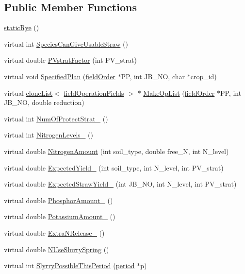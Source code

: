 \subsection*{Public Member Functions}
\begin{DoxyCompactItemize}
\item 
\hyperlink{classstatic_rye_ac213bcfc28e5c41044f1f8c1c0bcbe71}{staticRye} ()
\item 
virtual int \hyperlink{classstatic_rye_ad0e64c4bdab814efbe44b1ffbaf9a322}{SpeciesCanGiveUsableStraw} ()
\item 
virtual double \hyperlink{classstatic_rye_a2a8f5a4738e856f635722ea48bf1ea04}{PVstratFactor} (int PV\_\-strat)
\item 
virtual void \hyperlink{classstatic_rye_a9842ed0a85f8e721762a72f0d2252587}{SpecifiedPlan} (\hyperlink{classfield_order}{fieldOrder} $\ast$PP, int JB\_\-NO, char $\ast$crop\_\-id)
\item 
virtual \hyperlink{classclone_list}{cloneList}$<$ \hyperlink{classfield_operation_fields}{fieldOperationFields} $>$ $\ast$ \hyperlink{classstatic_rye_a0532c6cd87e39116de39436d5b47c7e8}{MakeOpList} (\hyperlink{classfield_order}{fieldOrder} $\ast$PP, int JB\_\-NO, double reduction)
\item 
virtual int \hyperlink{classstatic_rye_ac293d50ad067e382400530df8bcead56}{NumOfProtectStrat\_\-} ()
\item 
virtual int \hyperlink{classstatic_rye_a22cb837905cefab1cb8491b216a4eaa7}{NitrogenLevels\_\-} ()
\item 
virtual double \hyperlink{classstatic_rye_aec49ed18f9cc96318e71ca20d9caaddf}{NitrogenAmount} (int soil\_\-type, double free\_\-N, int N\_\-level)
\item 
virtual double \hyperlink{classstatic_rye_a6c6bedff00773f73edc12bba9702b27a}{ExpectedYield\_\-} (int soil\_\-type, int N\_\-level, int PV\_\-strat)
\item 
virtual double \hyperlink{classstatic_rye_a7e9c9e6226d2311ae3b621b79753bdf9}{ExpectedStrawYield\_\-} (int JB\_\-NO, int N\_\-level, int PV\_\-strat)
\item 
virtual double \hyperlink{classstatic_rye_a29a2a89b2cb2d8e47ee6b7881560b0f4}{PhosphorAmount\_\-} ()
\item 
virtual double \hyperlink{classstatic_rye_a48f4563a6399ff40bafcb87e53b2d4a1}{PotassiumAmount\_\-} ()
\item 
virtual double \hyperlink{classstatic_rye_a62343c8b7153985ed21866d7d64e5b40}{ExtraNRelease\_\-} ()
\item 
virtual double \hyperlink{classstatic_rye_af3bbe1562e3361dbfa02b186d11a810a}{NUseSlurrySpring} ()
\item 
virtual int \hyperlink{classstatic_rye_a8e23a3afa6cba94afd57049287748c99}{SlyrryPossibleThisPeriod} (\hyperlink{classperiod}{period} $\ast$p)
\end{DoxyCompactItemize}
